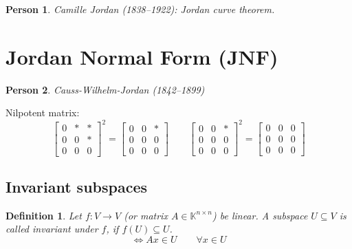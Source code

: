 \documentclass{article}
\newcounter{lecref}[section]
\numberwithin{lecref}{section}
\newtheorem{definition}[lecref]{Definition}
\newtheorem*{person}{Person}
\begin{document}
\begin{person}
  Camille Jordan (1838--1922): Jordan curve theorem.
\end{person}

\section{Jordan Normal Form (JNF)} %

\begin{person}
  Causs-Wilhelm-Jordan (1842--1899)
\end{person}


Nilpotent matrix:
\[
  \begin{bmatrix} 0 & * & * \\ 0 & 0 & * \\ 0 & 0 & 0 \end{bmatrix}^2
  = \begin{bmatrix} 0 & 0 & * \\ 0 & 0 & 0 \\ 0 & 0 & 0 \end{bmatrix}
  \qquad
  \begin{bmatrix} 0 & 0 & * \\ 0 & 0 & 0 \\ 0 & 0 & 0 \end{bmatrix}^2
  = \begin{bmatrix} 0 & 0 & 0 \\ 0 & 0 & 0 \\ 0 & 0 & 0 \end{bmatrix}
\]

\subsection{Invariant subspaces}

\begin{definition} %
  Let $f: V \to V$ (or matrix $A \in \mathbb K^{n\times n}$) be linear.
  A subspace $U \subseteq V$ is called \emph{invariant} under $f$, if $f(U) \subseteq U$.
  \[ \iff Ax \in U \qquad \forall x \in U \]
\end{definition}
\end{document}
